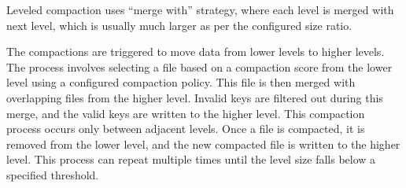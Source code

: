  Leveled compaction uses ``merge with'' strategy, where each level is merged with 
next level, which is usually much larger as per the configured size ratio.

The compactions are triggered to move data from lower levels to higher levels. The process involves selecting a file 
based on a compaction score from the lower level using a configured compaction policy. This file is then merged with 
overlapping files from the higher level. Invalid keys are filtered out during this merge, and the valid keys are 
written to the higher level. This compaction process occurs only between adjacent levels. Once a file is compacted, 
it is removed from the lower level, and the new compacted file is written to the higher level. This process can repeat
multiple times until the level size falls below a specified threshold.
